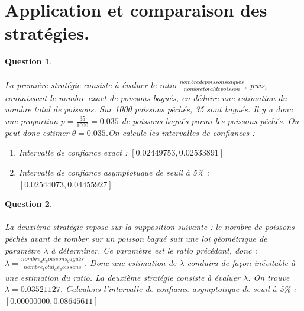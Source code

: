 \documentclass[a4paper,11pt]{article}
\newtheorem{exo3}{Question}
\begin{document}
\newpage

\section{Application et comparaison des stratégies.}

\begin{exo3} \ \\ \\
La première stratégie consiste à évaluer le ratio $ \frac{nombre de poissons bagués}{nombre total de poisson}$, puis, connaissant le nombre exact de poissons bagués, en déduire une estimation du nombre total de poissons. Sur 1000 poissons pêchés, 35 sont bagués. Il y a donc une proportion $p=\frac{35}{1000}=0.035$ de poissons bagués parmi les poissons pêchés. On peut donc estimer $\theta=0.035$.\newline On calcule les intervalles de confiances :
\begin{enumerate}
    \item Intervalle de confiance exact : $[0.02449753 , 0.02533891]$
    \item Intervalle de confiance asymptotuque de seuil à 5\% : $[0.02544073 , 0.04455927]$
\end{enumerate}
\end{exo3}

\begin{exo3} \ \\ \\
La deuxième stratégie repose sur la supposition suivante : le nombre de poissons pêchés avant de tomber sur un poisson bagué suit une loi géométrique de paramètre $\lambda$ à déterminer. Ce paramètre est le ratio précédant, donc :\newline $\lambda=\frac{nombre_de_poissons_bagués}{nombre_total_de_poissons}$. \newline Donc une estimation de $\lambda$ conduira de façon inévitable à une estimation du ratio. La deuxième stratégie consiste à évaluer $\lambda$. \newline On trouve $\lambda=0.03521127$. Calculons l'intervalle de confiance asymptotique de seuil à 5\% : \newline $[0.00000000, 0.08645611]$
\end{exo3}
\end{document}

